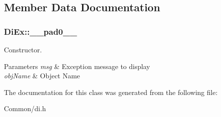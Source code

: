 \subsection{Member Data Documentation}
\hypertarget{class_di_ex_ad80ae482a21daa73f24fcc9c5911523f}{
\subsubsection[{\-\_\-\-\_\-pad0\-\_\-\-\_\-}]{\setlength{\rightskip}{0pt plus 5cm}Di\-Ex\-::\-\_\-\-\_\-pad0\-\_\-\-\_\-}}\label{class_di_ex_ad80ae482a21daa73f24fcc9c5911523f}


Constructor. 


\begin{DoxyParams}{Parameters}
{\em msg} & Exception message to display \\
\hline
{\em obj\-Name} & Object Name \\
\hline
\end{DoxyParams}


The documentation for this class was generated from the following file\-:\begin{DoxyCompactItemize}
\item 
Common/di.\-h\end{DoxyCompactItemize}
